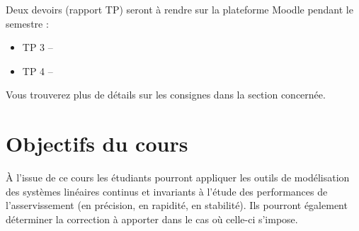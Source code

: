 \documentclass[a4paper,11pt]{article}
\begin{document}
Deux devoirs (rapport TP) seront à rendre sur la plateforme Moodle pendant le semestre :
\begin{itemize}
    \item TP 3 --
    \item TP 4 -- 
\end{itemize}

Vous trouverez plus de détails sur les consignes dans la section concernée. 

\section*{Objectifs du cours}
À l'issue de ce cours les étudiants pourront appliquer les outils de modélisation 
des systèmes linéaires continus et invariants à 
l'étude des performances de l'asservissement (en précision, en rapidité, en stabilité).
Ils pourront également déterminer la correction à apporter dans le cas où celle-ci s'impose.

\clearpage
\end{document}
